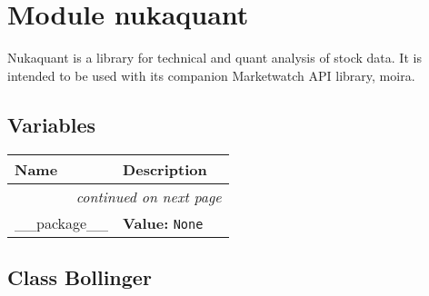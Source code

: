 %
%
%


\section{Module nukaquant}

    \label{nukaquant}
Nukaquant is a library for technical and quant analysis of stock data. It 
is intended to be used with its companion Marketwatch API library, moira.



  \subsection{Variables}

    \vspace{-1cm}
\hspace{\varindent}\begin{longtable}{|p{\varnamewidth}|p{\vardescrwidth}|l}
\cline{1-2}
\cline{1-2} \centering \textbf{Name} & \centering \textbf{Description}& \\
\cline{1-2}
\endhead\cline{1-2}\multicolumn{3}{r}{\small\textit{continued on next page}}\\\endfoot\cline{1-2}
\endlastfoot\raggedright \_\-\_\-p\-a\-c\-k\-a\-g\-e\-\_\-\_\- & \raggedright \textbf{Value:} 
{\tt None}&\\
\cline{1-2}
\end{longtable}



\subsection{Class Bollinger}

